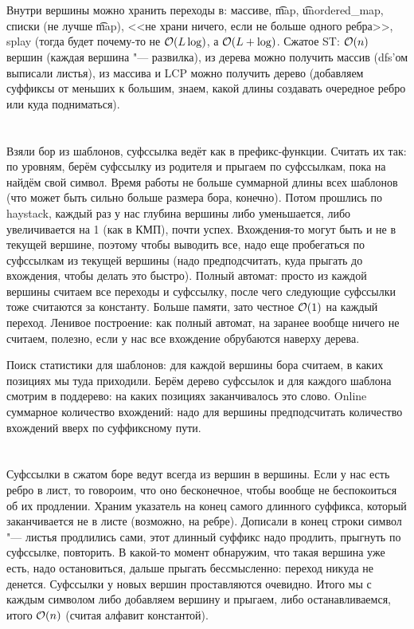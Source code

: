 \section{} %
Внутри вершины можно хранить переходы в: массиве, \t{map}, \t{unordered\_map}, списки (не лучше \t{map}), <<не храни ничего, если не больше одного ребра>>, splay (тогда будет почему-то не $\mathcal{O}(L\log)$, а $\mathcal{O}(L + \log)$.
Сжатое ST: $\mathcal{O}(n)$ вершин (каждая вершина "--- развилка), из дерева можно получить массив (dfs'ом выписали листья), из массива и LCP можно получить дерево (добавляем суффиксы от меньших к большим, знаем, какой длины создавать очередное ребро или куда подниматься).

\section{} %
Взяли бор из шаблонов, суфссылка ведёт как в префикс-функции.
Считать их так: по уровням, берём суфссылку из родителя и прыгаем по суфссылкам, пока на найдём свой символ.
Время работы не больше суммарной длины всех шаблонов (что может быть сильно больше размера бора, конечно).
Потом прошлись по haystack, каждый раз у нас глубина вершины либо уменьшается, либо увеличивается на 1 (как в КМП), почти успех.
Вхождения-то могут быть и не в текущей вершине, поэтому чтобы выводить все, надо еще пробегаться по суфссылкам из текущей вершины (надо предподсчитать, куда прыгать до вхождения, чтобы делать это быстро).
Полный автомат: просто из каждой вершины считаем все переходы и суфссылку, после чего следующие суфссылки тоже считаются за константу.
Больше памяти, зато честное $\mathcal{O}(1)$ на каждый переход.
Ленивое построение: как полный автомат, на заранее вообще ничего не считаем, полезно, если у нас все вхождение обрубаются наверху дерева.

Поиск статистики для шаблонов: для каждой вершины бора считаем, в каких позициях мы туда приходили.
Берём дерево суфссылок и для каждого шаблона смотрим в поддерево: на каких позициях заканчивалось это слово.
Online суммарное количество вхождений: надо для вершины предподсчитать количество вхождений вверх по суффиксному пути.

\section{} %
Суфссылки в сжатом боре ведут всегда из вершин в вершины.
Если у нас есть ребро в лист, то говороим, что оно бесконечное, чтобы вообще не беспокоиться об их продлении.
Храним указатель на конец самого длинного суффикса, который заканчивается не в листе (возможно, на ребре).
Дописали в конец строки символ "--- листья продлились сами, этот длинный суффикс надо продлить, прыгнуть по суфссылке, повторить.
В какой-то момент обнаружим, что такая вершина уже есть, надо остановиться, дальше прыгать бессмысленно: переход никуда не денется.
Суфссылки у новых вершин проставляются очевидно.
Итого мы с каждым символом либо добавляем вершину и прыгаем, либо останавливаемся, итого $\mathcal{O}(n)$ (считая алфавит константой).

